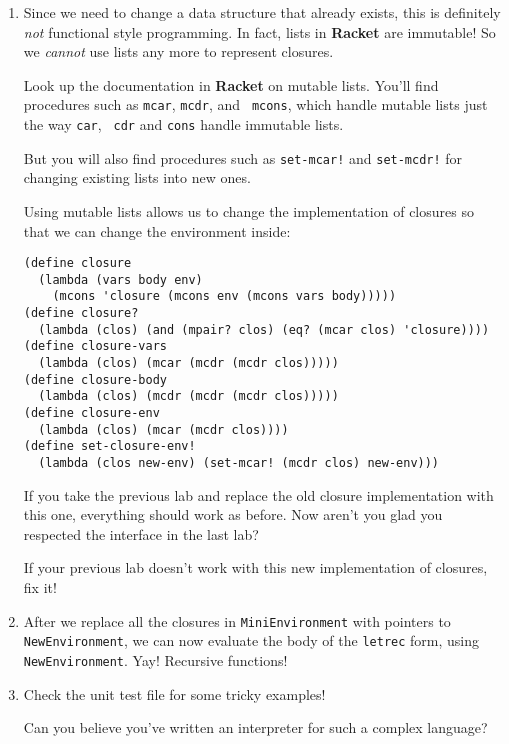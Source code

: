 \documentclass{article}
\begin{document}
\begin{enumerate}
\item Since we need to change a data structure that already exists,
  this is definitely {\em not} functional style programming.  In fact,
  lists in {\bf Racket} are immutable!  So we {\em cannot} use lists
  any more to represent closures.

 Look up the documentation in {\bf Racket} on mutable lists.
  You'll find procedures such as {\tt mcar}, {\tt mcdr}, and {\tt
    mcons}, which handle mutable lists just the way {\tt car}, {\tt
    cdr} and {\tt cons} handle immutable lists.

  But you will also find procedures such as {\tt set-mcar!} and
  {\tt set-mcdr!} for changing existing lists into new ones.

  Using mutable lists allows us to change the implementation of
  closures so that we can change the environment inside:

\begin{Verbatim}[frame=single,label=Mutable Closures]
(define closure
  (lambda (vars body env)
    (mcons 'closure (mcons env (mcons vars body)))))
(define closure?
  (lambda (clos) (and (mpair? clos) (eq? (mcar clos) 'closure))))
(define closure-vars
  (lambda (clos) (mcar (mcdr (mcdr clos)))))
(define closure-body
  (lambda (clos) (mcdr (mcdr (mcdr clos)))))
(define closure-env
  (lambda (clos) (mcar (mcdr clos))))
(define set-closure-env!
  (lambda (clos new-env) (set-mcar! (mcdr clos) new-env)))
\end{Verbatim}


If you take the previous lab and replace the old closure
implementation with this one, everything should work as before.  Now
aren't you glad you respected the interface in the last lab?

 If your previous lab doesn't work with this new implementation
  of closures, fix it!

\item After we replace all the closures in {\tt MiniEnvironment} with
  pointers to {\tt NewEnvironment}, we can now evaluate the body of
  the {\tt letrec} form, using {\tt NewEnvironment}.  Yay!  Recursive
  functions! 

\item Check the unit test file for some tricky examples!  

  Can you believe you've written an interpreter for such a complex language? 
\end{enumerate}
\end{document}
